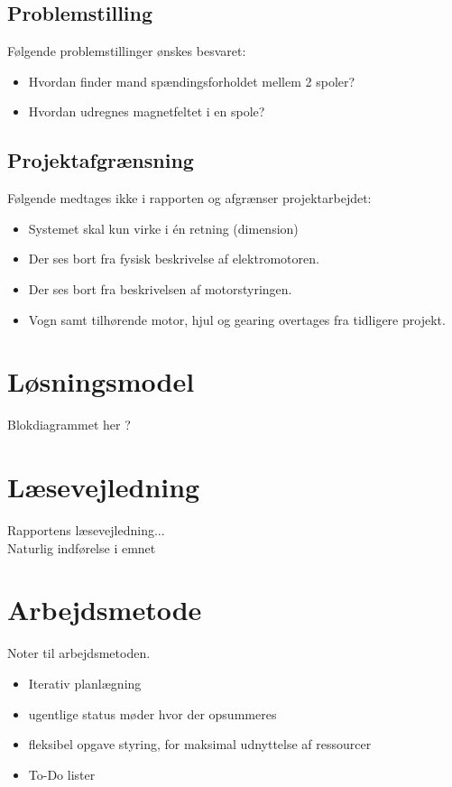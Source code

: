 \subsection{Problemstilling}
Følgende problemstillinger ønskes besvaret:
\begin{itemize}
\item Hvordan finder mand spændingsforholdet mellem 2 spoler?
\item Hvordan udregnes magnetfeltet i en spole?
\end{itemize}

\subsection{Projektafgrænsning}
Følgende medtages ikke i rapporten og afgrænser projektarbejdet:
\begin{itemize}
\item Systemet skal kun virke i én retning (dimension)
\item Der ses bort fra fysisk beskrivelse af elektromotoren.
\item Der ses bort fra beskrivelsen af motorstyringen.
\item Vogn samt tilhørende motor, hjul og gearing overtages fra tidligere projekt.
\end{itemize}

\section{Løsningsmodel}
Blokdiagrammet her ?

\section{Læsevejledning}
Rapportens læsevejledning...\\
Naturlig indførelse i emnet

\section{Arbejdsmetode}
Noter til arbejdsmetoden.
\begin{itemize}
	\item Iterativ planlægning
	\item ugentlige status møder hvor der opsummeres
	\item fleksibel opgave styring, for maksimal udnyttelse af ressourcer 
	\item To-Do lister
\end{itemize}

